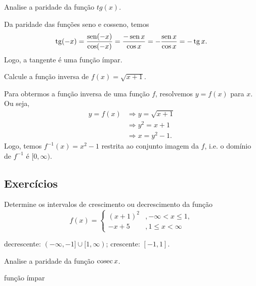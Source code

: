\begin{exeresol}
  Analise a paridade da função $tg(x)$.
\end{exeresol}
\begin{resol}
  Da paridade das funções seno e cosseno, temos
  \begin{equation}
    \operatorname{tg}(-x) = \frac{\operatorname{sen}(-x)}{\cos(-x)} = \frac{-\operatorname{sen} x}{\cos x} = -\frac{\operatorname{sen} x}{\cos x} = -\operatorname{tg} x.
  \end{equation}
  Logo, a tangente é uma função ímpar.
\end{resol}

\begin{exeresol}
  Calcule a função inversa de $f(x) = \sqrt{x+1}$.
\end{exeresol}
\begin{resol}
  Para obtermos a função inversa de uma função $f$, resolvemos $y = f(x)$ para $x$. Ou seja,
  \begin{align}
    y = f(x) &\Rightarrow y = \sqrt{x+1}\\
             &\Rightarrow y^2 = x+1\\
             &\Rightarrow x = y^2 - 1.
  \end{align}
  Logo, temos $f^{-1}(x) = x^2 - 1$ restrita ao conjunto imagem da $f$, i.e. o domínio de $f^{-1}$ é $[0, \infty)$.
\end{resol}

\subsection*{Exercícios}

\begin{exer}
  Determine os intervalos de crescimento ou decrescimento da função
  \begin{equation}
    f(x) = \left\{
      \begin{array}{ll}
        (x+1)^2 &, -\infty < x \leq 1,\\
        -x+5 &, 1 \leq x < \infty
      \end{array}
\right.
  \end{equation}
\end{exer}
\begin{resp}
  decrescente: $(-\infty, -1]\cup [1, \infty)$; crescente: $[-1, 1]$.
\end{resp}

\begin{exer}
  Analise a paridade da função $\operatorname{cosec} x$.
\end{exer}
\begin{resp}
  função ímpar
\end{resp}

